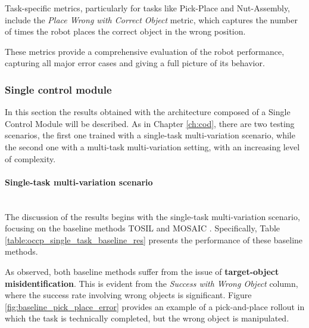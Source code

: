 Task-specific metrics, particularly for tasks like Pick-Place and Nut-Assembly, include the 
\textit{Place Wrong with Correct Object} metric, which captures the number of times the robot places the correct object in the wrong position.

These metrics provide a comprehensive evaluation of the robot performance, capturing all major error cases and giving a full picture of its behavior.

\subsubsection{Single control module}
In this section the results obtained with the architecture composed of a Single Control Module will be described. As in Chapter \ref{ch:cod}, there are two testing scenarios, the first one trained with a single-task  multi-variation scenario, while the second one with a multi-task multi-variation setting, with an increasing level of complexity.
\label{sec:ocpl_results_scm}
\paragraph*{Single-task multi-variation scenario}\mbox{}\\

The discussion of the results begins with the single-task multi-variation scenario, focusing on the baseline methods TOSIL \cite{dasari2021transformers_one_shot} and MOSAIC \cite{mandi2022towards_more_generalizable_one_shot}. Specifically, Table \ref{table:occp_single_task_baseline_res} presents the performance of these baseline methods. 


As observed, both baseline methods suffer from the issue of \textbf{target-object misidentification}. This is evident from the \textit{Success with Wrong Object} column, where the success rate involving wrong objects is significant. Figure \ref{fig:baseline_pick_place_error} provides an example of a pick-and-place rollout in which the task is technically completed, but the wrong object is manipulated.


